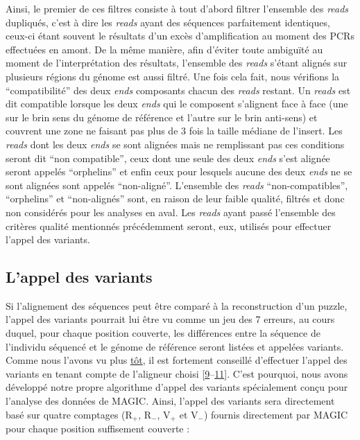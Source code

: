 \documentclass[12pt,twoside]{reedthesis}
\theoremstyle{definition}
\theoremstyle{definition}
\theoremstyle{remark}
\begin{document}
  Ainsi, le premier de ces filtres consiste à tout d'abord filtrer
  l'ensemble des \emph{reads} dupliqués, c'est à dire les \emph{reads}
  ayant des séquences parfaitement identiques, ceux-ci étant souvent le
  résultats d'un excès d'amplification au moment des PCRs effectuées en
  amont. De la même manière, afin d'éviter toute ambiguïté au moment de
  l'interprétation des résultats, l'ensemble des \emph{reads} s'étant
  alignés sur plusieurs régions du génome est aussi filtré. Une fois cela
  fait, nous vérifions la ``compatibilité'' des deux \emph{ends}
  composants chacun des \emph{reads} restant. Un \emph{reads} est dit
  compatible lorsque les deux \emph{ends} qui le composent s'alignent face
  à face (une sur le brin sens du génome de référence et l'autre sur le
  brin anti-sens) et couvrent une zone ne faisant pas plus de 3 fois la
  taille médiane de l'insert. Les \emph{reads} dont les deux \emph{ends}
  se sont alignées mais ne remplissant pas ces conditions seront dit ``non
  compatible'', ceux dont une seule des deux \emph{ends} s'est alignée
  seront appelés ``orphelins'' et enfin ceux pour lesquels aucune des deux
  \emph{ends} ne se sont alignées sont appelés ``non-aligné''. L'ensemble
  des \emph{reads} ``non-compatibles'', ``orphelins'' et ``non-alignés''
  sont, en raison de leur faible qualité, filtrés et donc non considérés
  pour les analyses en aval. Les \emph{reads} ayant passé l'ensemble des
  critères qualité mentionnés précédemment seront, eux, utilisés pour
  effectuer l'appel des variants.
  
  \newpage
  
  \subsection{L'appel des variants}\label{lappel-des-variants}
  
  Si l'alignement des séquences peut être comparé à la reconstruction d'un
  puzzle, l'appel des variants pourrait lui être vu comme un jeu des 7
  erreurs, au cours duquel, pour chaque position couverte, les différences
  entre la séquence de l'individu séquencé et le génome de référence
  seront listées et appelées variants. Comme nous l'avons vu plus
  \protect\hyperlink{varcall}{tôt}, il est fortement conseillé d'effectuer
  l'appel des variants en tenant compte de l'aligneur choisi
  {[}\protect\hyperlink{ref-Nielsen2011}{9}--\protect\hyperlink{ref-Lunter2011}{11}{]}.
  C'est pourquoi, nous avons développé notre propre algorithme d'appel des
  variants spécialement conçu pour l'analyse des données de MAGIC. Ainsi,
  l'appel des variants sera directement basé sur quatre comptages
  (R\(_+\), R\(_-\), V\(_+\) et V\(_-\)) fournis directement par MAGIC
  pour chaque position suffisement couverte :
  
\end{document}
